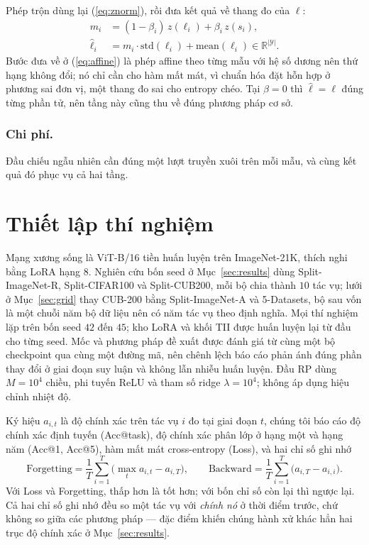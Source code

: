 \documentclass[runningheads]{llncs}
\begin{document}
Phép trộn dùng lại (\ref{eq:znorm}), rồi đưa kết quả về thang đo của $\ell$:
\begin{align}
m_i &= (1 - \beta_i)\, z(\ell_i) + \beta_i\, z(s_i),
\label{eq:mix}\\
\hat{\ell}_i &= m_i \cdot \mathrm{std}(\ell_i) + \mathrm{mean}(\ell_i)
   \in \mathbb{R}^{|\mathcal{Y}|}.
\label{eq:affine}
\end{align}
Bước đưa về ở (\ref{eq:affine}) là phép affine theo từng mẫu với hệ số dương nên
thứ hạng không đổi; nó chỉ cần cho hàm mất mát, vì chuẩn hóa đặt hỗn hợp ở phương
sai đơn vị, một thang đo sai cho entropy chéo. Tại $\beta = 0$ thì
$\hat{\ell} = \ell$ đúng từng phần tử, nên tầng này cũng thu về đúng phương pháp cơ
sở.

\subsubsection{Chi phí.}
Đầu chiếu ngẫu nhiên cần đúng một lượt truyền xuôi trên mỗi mẫu, và cùng kết quả
đó phục vụ cả hai tầng.

\section{Thiết lập thí nghiệm}
\label{sec:setup}

Mạng xương sống là ViT-B/16 tiền huấn luyện trên ImageNet-21K, thích nghi bằng
LoRA hạng $8$. Nghiên cứu bốn seed ở Mục~\ref{sec:results} dùng Split-ImageNet-R,
Split-CIFAR100 và Split-CUB200, mỗi bộ chia thành $10$ tác vụ; lưới ở
Mục~\ref{sec:grid} thay CUB-200 bằng Split-ImageNet-A và 5-Datasets, bộ sau vốn
là một chuỗi năm bộ dữ liệu nên có năm tác vụ theo định nghĩa. Mọi thí nghiệm lặp
trên bốn seed $42$ đến $45$; kho LoRA và khối TII được huấn luyện lại từ đầu cho
từng seed. Mốc và phương pháp đề xuất được đánh giá từ cùng một bộ checkpoint qua
cùng một đường mã, nên chênh lệch báo cáo phản ánh đúng phần thay đổi ở giai đoạn
suy luận và không lẫn nhiễu huấn luyện. Đầu RP dùng $M = 10^4$ chiều, phi tuyến
ReLU và tham số ridge $\lambda = 10^4$; không áp dụng hiệu chỉnh nhiệt độ.

Ký hiệu $a_{i,t}$ là độ chính xác trên tác vụ $i$ đo tại giai đoạn $t$, chúng tôi
báo cáo độ chính xác định tuyến (Acc@task), độ chính xác phân lớp ở hạng một và
hạng năm (Acc@1, Acc@5), hàm mất mát cross-entropy (Loss), và hai chỉ số ghi nhớ
\begin{equation}
\mathrm{Forgetting} = \frac{1}{T}\sum_{i=1}^{T}
\Big( \max_{t} a_{i,t} - a_{i,T} \Big),
\qquad
\mathrm{Backward} = \frac{1}{T}\sum_{i=1}^{T} \big( a_{i,T} - a_{i,i} \big).
\label{eq:metrics}
\end{equation}
Với Loss và Forgetting, thấp hơn là tốt hơn; với bốn chỉ số còn lại thì ngược
lại. Cả hai chỉ số ghi nhớ đều so một tác vụ với \emph{chính nó} ở thời điểm
trước, chứ không so giữa các phương pháp --- đặc điểm khiến chúng hành xử khác
hẳn hai trục độ chính xác ở Mục~\ref{sec:results}.
\end{document}
